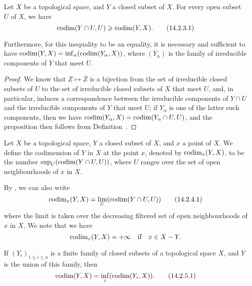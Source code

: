 \begin{prop}[14.2.3]
\label{0.14.2.3}
Let $X$ be a topological space, and $Y$ a closed subset of $X$.
For every open subset $U$ of $X$, we have
\begin{equation*}
\label{0.14.2.3.1}
    {\mathop{\mathrm{codim}}\nolimits}(Y\cap U,U) \geqslant {\mathop{\mathrm{codim}}\nolimits}(Y,X).\tag{14.2.3.1}
\end{equation*}

Furthermore, for this inequality  to be an equality, it is necessary and sufficient to have ${\mathop{\mathrm{codim}}\nolimits}(Y,X)=\inf_\alpha({\mathop{\mathrm{codim}}\nolimits}(Y_\alpha,X))$, where $(Y_\alpha)$ is the family of irreducible components of $Y$ that meet $U$.
\end{prop}

\begin{proof}
\label{proof-0.14.2.3}
We know  that $Z\mapsto\overline{Z}$ is a bijection from the set of irreducible closed subsets of $U$ to the set of irreducible closed subsets of $X$ that meet $U$, and, in particular, induces a correspondence between the irreducible components of $Y\cap U$ and the irreducible components of $Y$ that meet $U$;
if $Y_\alpha$ is one of the latter such components, then we have ${\mathop{\mathrm{codim}}\nolimits}(Y_\alpha,X)={\mathop{\mathrm{codim}}\nolimits}(Y_\alpha\cap U,U)$, and the proposition then follows from Definition~.
\end{proof}

\begin{defn}[14.2.4]
\label{0.14.2.4}
Let $X$ be a topological space, $Y$ a closed subset of $X$, and $x$ a point of $X$.
We define the codimension of $Y$ in $X$ at the point $x$, denoted by ${\mathop{\mathrm{codim}}\nolimits}_x(Y,X)$, to be the number $\sup_U({\mathop{\mathrm{codim}}\nolimits}(Y\cap U,U))$, where $U$ ranges over the set of open neighbourhoods of $x$ in $X$.
\end{defn}

By , we can also write
\begin{equation*}
\label{0.14.2.4.1}
    {\mathop{\mathrm{codim}}\nolimits}_x(Y,X) = \lim_U({\mathop{\mathrm{codim}}\nolimits}(Y\cap U, U))\tag{14.2.4.1}
\end{equation*}
where the limit is taken over the decreasing filtered set of open neighbourhoods of $x$ in $X$.
We note that we have
\[
    {\mathop{\mathrm{codim}}\nolimits}_x(Y,X) = +\infty \quad\text{if}\quad x\in X- Y.
\]

\begin{prop}[14.2.5]
\label{0.14.2.5}
If $(Y_i)_{1\leq i\leq n}$ is a finite family of closed subsets of a topological space $X$, and $Y$ is the union of this family, then
\begin{equation*}
\label{0.14.2.5.1}
    {\mathop{\mathrm{codim}}\nolimits}(Y,X) = \inf_i({\mathop{\mathrm{codim}}\nolimits}(Y_i,X)).\tag{14.2.5.1}
\end{equation*}
\end{prop}

